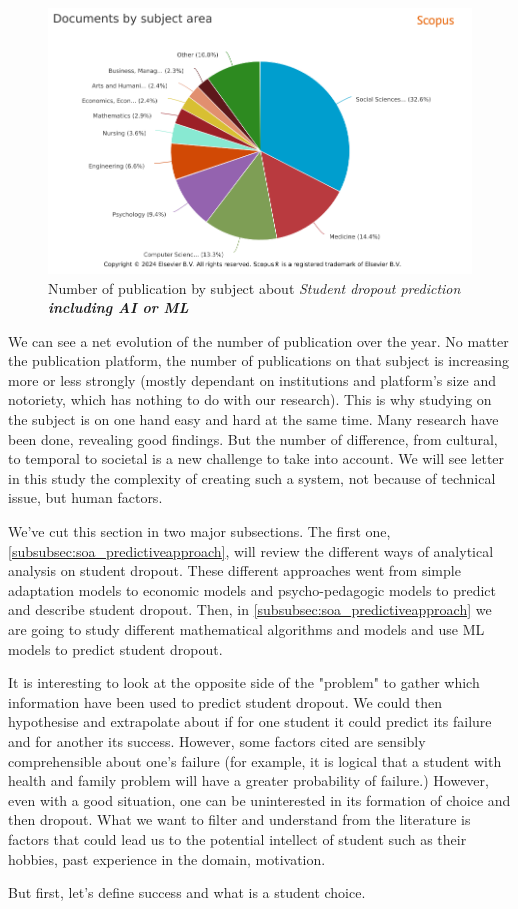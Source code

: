 \documentclass[../../main.tex]{subfiles}
\begin{document}
\begin{figure}
    \centering
    \includegraphics[width=1\linewidth]{res//graph/prediction student with AI/Scopus-Analyze-Subject.png}
    \caption{Number of publication by subject about \textit{Student dropout prediction \textbf{including AI or ML}}}
    \label{fig:nb_pub_scopus_predictstudent_subject}
\end{figure}


We can see a net evolution of the number of publication over the year. No matter the publication platform, the number of publications on that subject is increasing more or less strongly (mostly dependant on institutions and platform's size and notoriety, which has nothing to do with our research).
This is why studying on the subject is on one hand easy and hard at the same time. Many research have been done, revealing good findings. But the number of difference, from cultural, to temporal to societal is a new challenge to take into account. We will see letter in this study the complexity of creating such a system, not because of technical issue, but human factors.


We've cut this section in two major subsections. The first one, \ref{subsubsec:soa_predictiveapproach}, will review the different ways of analytical analysis on student dropout. These different approaches went from simple adaptation models to economic models and psycho-pedagogic models to predict and describe student dropout. Then, in \ref{subsubsec:soa_predictiveapproach} we are going to study different mathematical algorithms and models and use ML models to predict student dropout.

It is interesting to look at the opposite side of the "problem" to gather which information have been used to predict student dropout. We could then hypothesise and extrapolate about if for one student it could predict its failure and for another its success.
However, some factors cited are sensibly comprehensible about one's failure (for example, it is logical that a student with health and family problem will have a greater probability of failure.) However, even with a good situation, one can be uninterested in its formation of choice and then dropout. 
What we want to filter and understand from the literature is factors that could lead us to the potential intellect of student such as their hobbies, past experience in the domain, motivation.

But first, let's define success and what is a student choice. 
\end{document}
